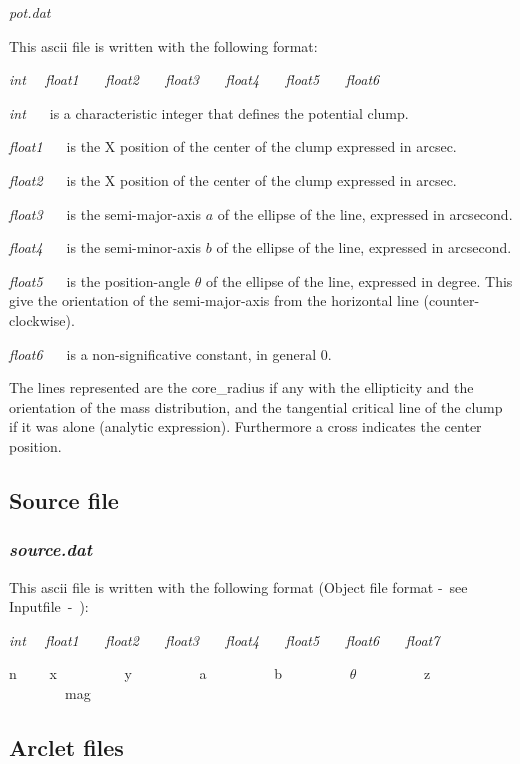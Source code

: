 {\sl pot.dat \ \ \ }

This ascii file is written with the following format:

{\sl int \ \  float1 \ \ \ float2 \ \ \ float3 \ \ \ float4
\ \ \ float5 \ \ \ float6}

{\sl int \ \ } is a characteristic integer that defines the potential clump.

{\sl float1 \ \ } is the X position of the center of the clump
expressed in arcsec.

{\sl float2 \ \ } is the X position of the center of the clump
expressed in arcsec.

{\sl float3 \ \ } is the semi-major-axis $a$ of the ellipse of the 
line, expressed in arcsecond.

{\sl float4 \ \ } is the semi-minor-axis $b$ of the ellipse of the 
line, expressed in arcsecond.

{\sl float5 \ \ } is the position-angle $\theta$ of the ellipse of the 
line, expressed in degree. This give the orientation of the semi-major-axis
from the horizontal line (counter-clockwise).

{\sl float6 \ \ } is a non-significative constant, in general $0$.


The lines represented are the core{\_}radius if any with the ellipticity
and the orientation of the mass distribution, and the tangential
critical line of the clump if it was alone (analytic expression).
Furthermore a cross indicates the center position.

\subsection{Source file}

\subsubsection{\sl source.dat \ \ \ }

This ascii file is written with the following format (Object file format -~see
Inputfile~-~):

{\sl int \ \  float1 \ \ \ float2 \ \ \ float3 \ \ \ float4
\ \ \ float5 \ \ \ float6 \ \ \ float7}

n \ \ \ \ x \ \ \ \ \ \ \ \ \ y \ \ \ \ \ \ \ \ \ a \ \ \ \ \ \ \ \ \ 
b \ \ \ \ \ \ \ \ \ $\theta$ \ \ \ \ \ \ \ \ \ z \ \ \ \ \ \ \ \ mag\\

\subsection{Arclet files}


